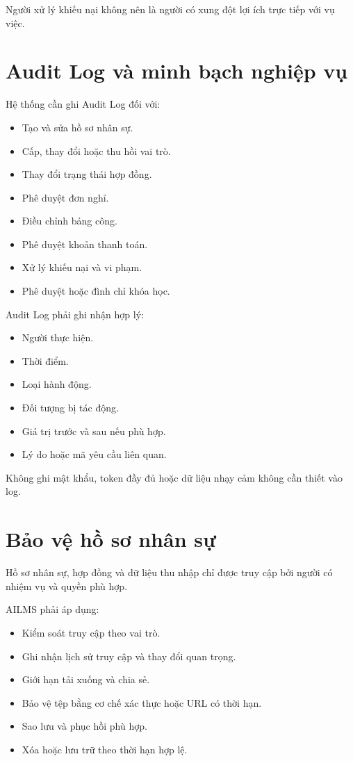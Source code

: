 \documentclass[12pt,a4paper]{article}
\begin{document}
Người xử lý khiếu nại không nên là người có xung đột lợi ích trực tiếp với vụ việc.

\section{Audit Log và minh bạch nghiệp vụ}

Hệ thống cần ghi Audit Log đối với:

\begin{itemize}
    \item Tạo và sửa hồ sơ nhân sự.
    \item Cấp, thay đổi hoặc thu hồi vai trò.
    \item Thay đổi trạng thái hợp đồng.
    \item Phê duyệt đơn nghỉ.
    \item Điều chỉnh bảng công.
    \item Phê duyệt khoản thanh toán.
    \item Xử lý khiếu nại và vi phạm.
    \item Phê duyệt hoặc đình chỉ khóa học.
\end{itemize}

Audit Log phải ghi nhận hợp lý:

\begin{itemize}
    \item Người thực hiện.
    \item Thời điểm.
    \item Loại hành động.
    \item Đối tượng bị tác động.
    \item Giá trị trước và sau nếu phù hợp.
    \item Lý do hoặc mã yêu cầu liên quan.
\end{itemize}

Không ghi mật khẩu, token đầy đủ hoặc dữ liệu nhạy cảm không cần thiết vào log.

\section{Bảo vệ hồ sơ nhân sự}

Hồ sơ nhân sự, hợp đồng và dữ liệu thu nhập chỉ được truy cập bởi
người có nhiệm vụ và quyền phù hợp.

AILMS phải áp dụng:

\begin{itemize}
    \item Kiểm soát truy cập theo vai trò.
    \item Ghi nhận lịch sử truy cập và thay đổi quan trọng.
    \item Giới hạn tải xuống và chia sẻ.
    \item Bảo vệ tệp bằng cơ chế xác thực hoặc URL có thời hạn.
    \item Sao lưu và phục hồi phù hợp.
    \item Xóa hoặc lưu trữ theo thời hạn hợp lệ.
\end{itemize}
\end{document}
